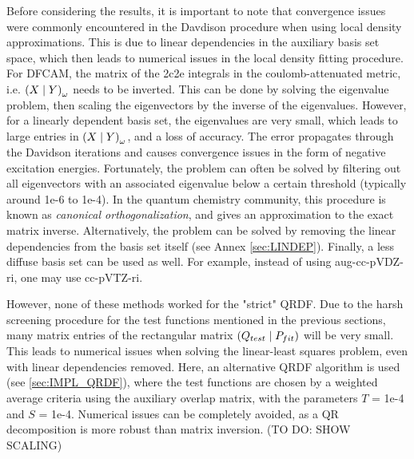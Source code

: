 
Before considering the results, it is important to note that convergence issues were commonly encountered in the Davdison procedure when using local density approximations. This is due to linear dependencies in the auxiliary basis set space, which then leads to numerical issues in the local density fitting procedure. For DFCAM, the matrix of the 2c2e integrals in the coulomb-attenuated metric, i.e. $\left( X \mid Y \right)_{\omega}$ needs to be inverted. This can be done by solving the eigenvalue problem, then scaling the eigenvectors by the inverse of the eigenvalues. However, for a linearly dependent basis set, the eigenvalues are very small, which leads to large entries in $\left( X \mid Y \right)_{\omega}$, and a loss of accuracy. The error propagates through the Davidson iterations and causes convergence issues in the form of negative excitation energies. Fortunately, the problem can often be solved by filtering out all eigenvectors with an associated eigenvalue below a certain threshold (typically around 1e-6 to 1e-4). In the quantum chemistry community, this procedure is known as \emph{canonical orthogonalization}, and gives an approximation to the exact matrix inverse. Alternatively, the problem can be solved by removing the linear dependencies from the basis set itself (see Annex \ref{sec:LINDEP}). Finally, a less diffuse basis set can be used as well. For example, instead of using aug-cc-pVDZ-ri, one may use cc-pVTZ-ri.

However, none of these methods worked for the "strict" QRDF. Due to the harsh screening procedure for the test functions mentioned in the previous sections, many matrix entries of the rectangular matrix $\left( Q_{test} \mid P_{fit} \right)$ will be very small. This leads to numerical issues when solving the linear-least squares problem, even with linear dependencies removed. Here, an alternative QRDF algorithm is used (see \ref{sec:IMPL_QRDF}), where the test functions are chosen by a weighted average criteria using the auxiliary overlap matrix, with the parameters $T$ = 1e-4 and $S$ = 1e-4. Numerical issues can be completely avoided, as a QR decomposition is more robust than matrix inversion. (TO DO: SHOW SCALING)

